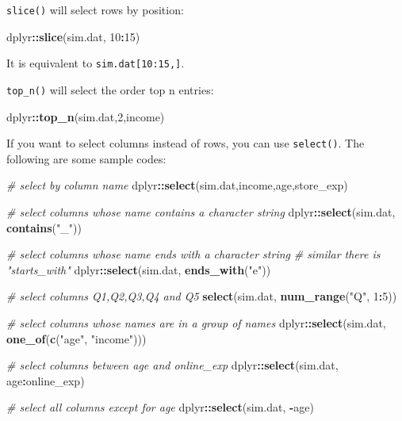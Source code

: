 \documentclass[12pt,]{krantz}
\makeatletter
\newenvironment{Shaded}{\begin{snugshade}}{\end{snugshade}}
\newcommand{\CommentTok}[1]{\textcolor[rgb]{0.37,0.37,0.37}{\textit{#1}}}
\newcommand{\DecValTok}[1]{\textcolor[rgb]{0.06,0.06,0.06}{#1}}
\newcommand{\KeywordTok}[1]{\textcolor[rgb]{0.27,0.27,0.27}{\textbf{#1}}}
\newcommand{\NormalTok}[1]{#1}
\newcommand{\OperatorTok}[1]{\textcolor[rgb]{0.43,0.43,0.43}{\textbf{#1}}}
\newcommand{\StringTok}[1]{\textcolor[rgb]{0.5,0.5,0.5}{#1}}
\newenvironment{kframe}{%
\medskip{}
\setlength{\fboxsep}{.8em}
 \def\at@end@of@kframe{}%
 \ifinner\ifhmode%
  \def\at@end@of@kframe{\end{minipage}}%
  \begin{minipage}{\columnwidth}%
 \fi\fi%
 \def\FrameCommand##1{\hskip\@totalleftmargin \hskip-\fboxsep
 \colorbox{shadecolor}{##1}\hskip-\fboxsep
     \hskip-\linewidth \hskip-\@totalleftmargin \hskip\columnwidth}%
 \MakeFramed {\advance\hsize-\width
   \@totalleftmargin\z@ \linewidth\hsize
   \@setminipage}}%
 {\par\unskip\endMakeFramed%
 \at@end@of@kframe}
\renewenvironment{Shaded}{\begin{kframe}}{\end{kframe}}
\makeatother
\begin{document}
\texttt{slice()} will select rows by position:

\begin{Shaded}
\begin{Highlighting}[]
\NormalTok{dplyr}\OperatorTok{::}\KeywordTok{slice}\NormalTok{(sim.dat, }\DecValTok{10}\OperatorTok{:}\DecValTok{15}\NormalTok{) }
\end{Highlighting}
\end{Shaded}

It is equivalent to \texttt{sim.dat{[}10:15,{]}}.

\texttt{top\_n()} will select the order top n entries:

\begin{Shaded}
\begin{Highlighting}[]
\NormalTok{dplyr}\OperatorTok{::}\KeywordTok{top_n}\NormalTok{(sim.dat,}\DecValTok{2}\NormalTok{,income)}
\end{Highlighting}
\end{Shaded}

If you want to select columns instead of rows, you can use \texttt{select()}. The following are some sample codes:

\begin{Shaded}
\begin{Highlighting}[]
\CommentTok{# select by column name}
\NormalTok{dplyr}\OperatorTok{::}\KeywordTok{select}\NormalTok{(sim.dat,income,age,store_exp)}

\CommentTok{# select columns whose name contains a character string}
\NormalTok{dplyr}\OperatorTok{::}\KeywordTok{select}\NormalTok{(sim.dat, }\KeywordTok{contains}\NormalTok{(}\StringTok{"_"}\NormalTok{))}

\CommentTok{# select columns whose name ends with a character string}
\CommentTok{# similar there is "starts_with"}
\NormalTok{dplyr}\OperatorTok{::}\KeywordTok{select}\NormalTok{(sim.dat, }\KeywordTok{ends_with}\NormalTok{(}\StringTok{"e"}\NormalTok{))}

\CommentTok{# select columns Q1,Q2,Q3,Q4 and Q5}
\KeywordTok{select}\NormalTok{(sim.dat, }\KeywordTok{num_range}\NormalTok{(}\StringTok{"Q"}\NormalTok{, }\DecValTok{1}\OperatorTok{:}\DecValTok{5}\NormalTok{)) }

\CommentTok{# select columns whose names are in a group of names}
\NormalTok{dplyr}\OperatorTok{::}\KeywordTok{select}\NormalTok{(sim.dat, }\KeywordTok{one_of}\NormalTok{(}\KeywordTok{c}\NormalTok{(}\StringTok{"age"}\NormalTok{, }\StringTok{"income"}\NormalTok{)))}

\CommentTok{# select columns between age and online_exp}
\NormalTok{dplyr}\OperatorTok{::}\KeywordTok{select}\NormalTok{(sim.dat, age}\OperatorTok{:}\NormalTok{online_exp)}

\CommentTok{# select all columns except for age}
\NormalTok{dplyr}\OperatorTok{::}\KeywordTok{select}\NormalTok{(sim.dat, }\OperatorTok{-}\NormalTok{age)}
\end{Highlighting}
\end{Shaded}
\end{document}
